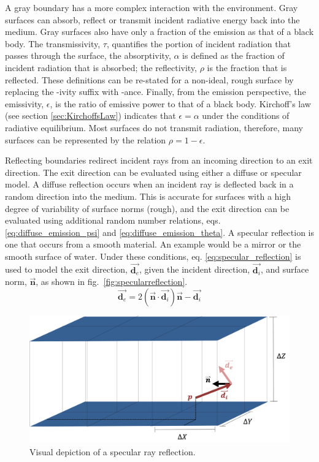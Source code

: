 A gray boundary has a more complex interaction with the environment. Gray surfaces can absorb, reflect or transmit incident radiative energy back into the medium. Gray surfaces also have only a fraction of the emission as that of a black body.
The transmissivity, $\tau{}$, quantifies the portion of incident radiation that passes through the surface, the absorptivity, $\alpha$ is defined as the fraction of incident radiation that is absorbed; the reflectivity, $\rho$ is the fraction that is reflected. These definitions can be re-stated for a non-ideal, rough surface by replacing the -ivity suffix with -ance. 
Finally, from the emission perspective, the emissivity, $\epsilon$, is the ratio of emissive power to that of a black body.  Kirchoff's law (see section \ref{sec:KirchoffsLaw}) indicates that $\epsilon{}=\alpha{}$ under the conditions of radiative equilibrium.
Most surfaces do not transmit radiation, therefore, many surfaces can be represented by the relation $\rho{}=1-\epsilon$. 

Reflecting boundaries redirect incident rays from an incoming direction to an exit direction. 
The exit direction can be evaluated using either a diffuse or specular model. 
A diffuse reflection occurs when an incident ray is deflected back in a random direction into the medium. This is accurate for surfaces with a high degree of variability of surface norms (rough), and the exit direction can be evaluated using additional random number relations, eqs. \ref{eq:diffuse_emission_psi} and \ref{eq:diffuse_emission_theta}.
A specular reflection is one that occurs from a smooth material. 
An example would be a mirror or the smooth surface of water. Under these conditions, eq. \ref{eq:specular_reflection} is used to model the exit direction, $\Vec{\textbf{d}_{e}}$, given the incident direction, $\Vec{\textbf{d}_i}$, and surface norm, $\vec{\textbf{n}}$, as shown in fig.~\ref{fig:specularreflection}.
\begin{equation}
    \Vec{\textbf{d}_e}=2(\Vec{\textbf{n}}\cdot\Vec{\textbf{d}_i})\Vec{\textbf{n}} -\Vec{\textbf{d}_i}
    \label{eq:specular_reflection}
\end{equation}
\begin{figure}
\centering
\includegraphics[width=0.8\linewidth]{figures/ch3/SpecularReflection.png}
\caption{Visual depiction of a specular ray reflection. }
\label{fig:raytracing}
\end{figure}


